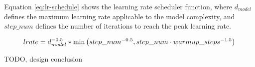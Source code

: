 Equation \ref{eq:lr-schedule} shows the learning rate scheduler function, where $d_{model}$ defines the maximum learning rate applicable to the model complexity, and $step\_num$ defines the number of iterations to reach the peak learning rate.

\begin{equation}
    lrate=d_{model}^{-0.5} * \min \left(step\_num^{-0.5}, step\_num \cdot  warmup\_steps^{-1.5}\right)
    \eqcite{vaswani2017attention}
    \label{eq:lr-schedule}
\end{equation}

TODO, design conclusion
